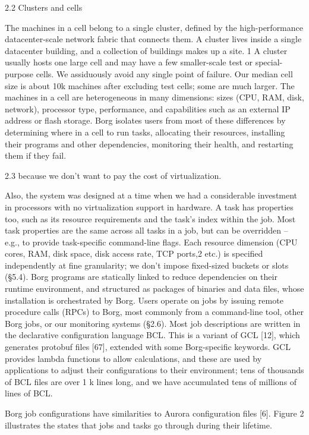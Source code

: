 2.2 Clusters and cells

The machines in a cell belong to a single cluster, defined by the
high-performance datacenter-scale network fabric that connects them.
A cluster lives inside a single datacenter building, and a collection of
buildings makes up a site.
1 A cluster usually hosts one large cell and may have a few smaller-scale test
or special-purpose cells.
We assiduously avoid any single point of failure.
Our median cell size is about 10k machines after excluding test cells; some are
much larger.
The machines in a cell are heterogeneous in many dimensions: sizes (CPU, RAM,
disk, network), processor type, performance, and capabilities such as an
external IP address or flash storage.
Borg isolates users from most of these differences by determining where in a
cell to run tasks, allocating their resources, installing their programs and
other dependencies, monitoring their health, and restarting them if they fail.

2.3 because we don’t want to pay the cost of virtualization.

Also, the system was designed at a time when we had a considerable investment in
processors with no virtualization support in hardware.
A task has properties too, such as its resource requirements and the task’s
index within the job.
Most task properties are the same across all tasks in a job, but can be
overridden – e.g., to provide task-specific command-line flags.
Each resource dimension (CPU cores, RAM, disk space, disk access rate, TCP
ports,2 etc.) is specified independently at fine granularity; we don’t impose
fixed-sized buckets or slots (§5.4).
Borg programs are statically linked to reduce dependencies on their runtime
environment, and structured as packages of binaries and data files, whose
installation is orchestrated by Borg.
Users operate on jobs by issuing remote procedure calls (RPCs) to Borg, most
commonly from a command-line tool, other Borg jobs, or our monitoring systems
(§2.6). 
Most job descriptions are written in the declarative configuration language BCL.
This is a variant of GCL [12], which generates protobuf files [67], extended
with some Borg-specific keywords. GCL provides lambda functions to allow
calculations, and these are used by applications to adjust their configurations
to their environment; tens of thousands of BCL files are over 1 k lines long,
and we have accumulated tens of millions of lines of BCL.

Borg job configurations have similarities to Aurora configuration files [6].
Figure 2 illustrates the states that jobs and tasks go through during their
lifetime.

